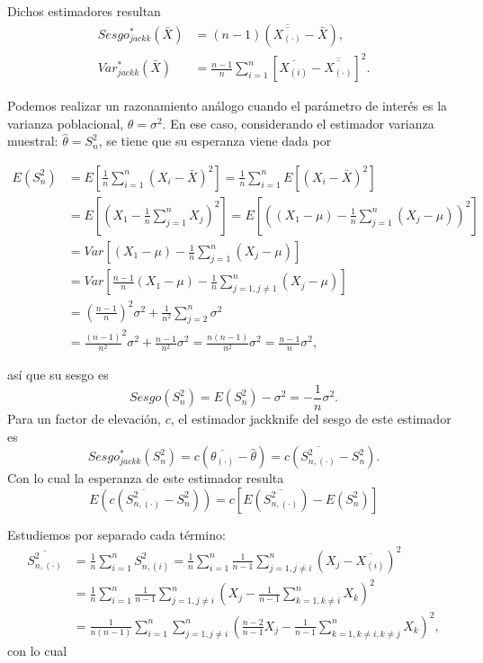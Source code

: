 \documentclass[
]{book}
\theoremstyle{break}
\theoremstyle{nonumberplain}
\begin{document}
Dichos estimadores resultan
\[\begin{aligned}
Sesgo_{jackk}^{\ast}\left( \bar{X} \right) 
&= \left( n-1 \right) \left( \overline{\overline{X_{(\cdot)}}}-\bar{X} \right), \\
Var_{jackk}^{\ast}\left( \bar{X} \right) 
&= \frac{n-1}{n}\sum_{i=1}^{n}\left[ \overline{X_{(i)}}
- \overline{\overline{X_{\left( \cdot \right)}}}\right]^2.
\end{aligned}\]

Podemos realizar un razonamiento análogo cuando el parámetro de interés
es la varianza poblacional, \(\theta =\sigma^2\). En ese caso,
considerando el estimador varianza muestral: \(\hat{\theta}=S_n^2\),
se tiene que su esperanza viene dada por

\[\begin{aligned}
E\left( S_n^2 \right) 
&= E\left[ \frac{1}{n}\sum_{i=1}^{n}\left( X_i- \bar{X} \right)^2\right] 
= \frac{1}{n}\sum_{i=1}^{n}E\left[ \left(X_i-\bar{X} \right)^2\right] \\
&= E\left[ \left( X_1-\frac{1}{n}\sum_{j=1}^{n}X_j \right)^2\right] 
= E \left[ \left( \left( X_1-\mu \right) 
- \frac{1}{n}\sum_{j=1}^{n}\left( X_j-\mu \right) \right)^2\right] \\
&= Var\left[ \left( X_1-\mu \right) 
- \frac{1}{n}\sum_{j=1}^{n}\left(X_j-\mu \right) \right] \\
&= Var\left[ \frac{n-1}{n}\left( X_1-\mu \right) 
- \frac{1}{n}\sum_{j=1,j\neq 1}^{n}\left( X_j-\mu \right) \right] \\
&= \left( \frac{n-1}{n} \right)^2\sigma^2+\frac{1}{n^2}\sum_{j=2}^{n}\sigma^2 \\
&= \frac{\left( n-1 \right)}{n^2}^2\sigma^2+\frac{n-1}{n^2}\sigma^2
=\frac{n\left( n-1 \right)}{n^2}\sigma^2=\frac{n-1}{n}\sigma^2,
\end{aligned}\]

así que su sesgo es
\[Sesgo\left( S_n^2 \right) =E\left( S_n^2 \right) -\sigma^2=-\frac{1}{n}\sigma^2.\]
Para un factor de elevación, \(c\), el estimador jackknife del sesgo de este estimador es
\[Sesgo_{jackk}^{\ast}\left( S_n^2 \right) 
= c\left( \overline{\theta_{(\cdot)}}-\hat{\theta} \right) 
= c\left( \overline{S_{n,(\cdot)}^2}-S_n^2 \right).\]
Con lo cual la esperanza de este estimador resulta
\[E\left( c\left( \overline{S_{n,(\cdot)}^2}-S_n^2 \right) \right) 
= c\left[ E\left( \overline{S_{n,(\cdot)}^2} \right) - E\left( S_n^2 \right) \right]\]

Estudiemos por separado cada término:
\[\begin{aligned}
\overline{S_{n,(\cdot)}^2} &= \frac{1}{n}\sum_{i=1}^{n}S_{n,(i)}^2
= \frac{1}{n}\sum_{i=1}^{n}\frac{1}{n-1}\sum_{j=1,j\neq i}^{n}\left( X_j-\overline{X_{(i)}} \right)^2 \\
&= \frac{1}{n}\sum_{i=1}^{n}\frac{1}{n-1}\sum_{j=1,j\neq i}^{n}\left( X_j 
- \frac{1}{n-1}\sum_{k=1,k\neq i}^{n}X_{k} \right)^2 \\
&= \frac{1}{n\left( n-1 \right)}\sum_{i=1}^{n}\sum_{j=1,j\neq i}^{n}\left( 
\frac{n-2}{n-1}X_j-\frac{1}{n-1}\sum_{k=1,k\neq i,k\neq j}^{n}X_{k} \right)^2,
\end{aligned}\]
con lo cual
\end{document}
